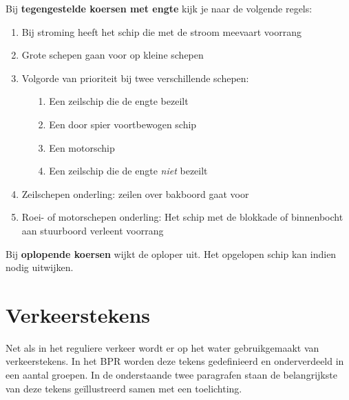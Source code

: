 Bij \textbf{tegengestelde koersen met engte} kijk je naar de volgende regels:
\vspace*{-0.15cm}
\begin{enumerate}
	\item Bij stroming heeft het schip die met de stroom meevaart voorrang
	\item Grote schepen gaan voor op kleine schepen
	\item Volgorde van prioriteit bij twee verschillende schepen:
	        \begin{enumerate}
					\item [1.] Een zeilschip die de engte bezeilt
					\item [2.] Een door spier voortbewogen schip
					\item [3.] Een motorschip
					\item [4.] Een zeilschip die de engte \textit{niet} bezeilt
					\end{enumerate}
	\item Zeilschepen onderling: zeilen over bakboord gaat voor 
	\item Roei- of motorschepen onderling: Het schip met de blokkade of binnenbocht aan stuurboord verleent voorrang

\end{enumerate}

Bij \textbf{oplopende koersen} wijkt de oploper uit. Het opgelopen schip kan indien nodig uitwijken.

\section{Verkeerstekens}
Net als in het reguliere verkeer wordt er op het water gebruikgemaakt van verkeerstekens. In het BPR worden deze tekens gedefinieerd en onderverdeeld in een aantal groepen. In de onderstaande twee paragrafen staan de belangrijkste van deze tekens geïllustreerd samen met een toelichting.

